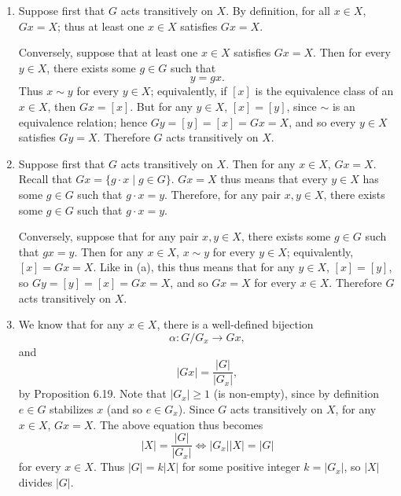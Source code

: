 \documentclass{homework}
\begin{document}
\begin{solution}
  \begin{enumerate}[label=(\alph*)]
    \item Suppose first that $G$ acts transitively on $X$. By definition, for all $x\in X$, $Gx=X$;
      thus at least one $x\in X$ satisfies $Gx=X$.

      Conversely, suppose that at least one $x\in X$ satisfies $Gx=X$. Then for every $y\in X$,
      there exists some $g\in G$ such that \[
        y=gx
      .\] Thus $x\sim y$ for every $y\in X$; equivalently, if $[x]$ is the equivalence class of an
      $x\in X$, then $Gx=[x]$. But for any $y\in X$, $[x]=[y]$, since $\sim $ is an equivalence
      relation; hence $Gy=[y]=[x]=Gx=X$, and so every $y\in X$ satisfies $Gy=X$. Therefore $G$ acts
      transitively on $X$.

    \item Suppose first that $G$ acts transitively on $X$. Then for any $x\in X$, $Gx=X$. Recall
      that $Gx=\{g\cdot x\mid g\in G\} $. $Gx=X$ thus means that every $y\in X$ has some $g\in G$
      such that $g\cdot x=y$. Therefore, for any pair $x,y\in X$, there exists some $g\in G$ such
      that $g\cdot x=y$.

      Conversely, suppose that for any pair $x,y\in X$, there exists some $g\in G$ such that $gx=y$.
      Then for any $x\in X$, $x\sim y$ for every $y\in X$; equivalently, $[x]=Gx=X$. Like in (a),
      this thus means that for any $y\in X$, $[x]=[y]$, so $Gy=[y]=[x]=Gx=X$, and so $Gx=X$ for
      every $x\in X$. Therefore $G$ acts transitively on $X$.

    \item We know that for any $x\in X$, there is a well-defined bijection \[
      \alpha: G / G_x \to Gx
    ,\] and \[
      \left| Gx \right| =\frac{\left| G \right| }{\left| G_x \right| }
    ,\] by Proposition 6.19.  Note that $\left| G_x \right| \ge 1$ (is non-empty), since by
    definition $e\in G$ stabilizes $x$ (and so $e\in G_x$). Since $G$ acts transitively on $X$, for
    any $x\in X$, $Gx=X$. The above equation thus becomes \[
      \left| X \right| =\frac{\left| G \right| }{\left| G_x \right| }\iff \left| G_x \right| \left|
      X\right| =\left| G \right| 
    \] for every $x\in X$. Thus $\left| G \right| =k\left| X \right| $ for some positive integer
    $k=\left| G_x \right| $, so $\left| X \right| $ divides $\left| G \right| $.
  \end{enumerate}
\end{solution}
\end{document}
